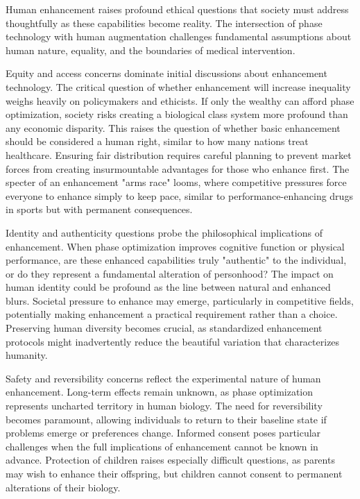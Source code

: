 \documentclass[12pt,a4paper]{report}
\begin{document}
Human enhancement raises profound ethical questions that society must address thoughtfully as these capabilities become reality. The intersection of phase technology with human augmentation challenges fundamental assumptions about human nature, equality, and the boundaries of medical intervention.

Equity and access concerns dominate initial discussions about enhancement technology. The critical question of whether enhancement will increase inequality weighs heavily on policymakers and ethicists. If only the wealthy can afford phase optimization, society risks creating a biological class system more profound than any economic disparity. This raises the question of whether basic enhancement should be considered a human right, similar to how many nations treat healthcare. Ensuring fair distribution requires careful planning to prevent market forces from creating insurmountable advantages for those who enhance first. The specter of an enhancement "arms race" looms, where competitive pressures force everyone to enhance simply to keep pace, similar to performance-enhancing drugs in sports but with permanent consequences.

Identity and authenticity questions probe the philosophical implications of enhancement. When phase optimization improves cognitive function or physical performance, are these enhanced capabilities truly "authentic" to the individual, or do they represent a fundamental alteration of personhood? The impact on human identity could be profound as the line between natural and enhanced blurs. Societal pressure to enhance may emerge, particularly in competitive fields, potentially making enhancement a practical requirement rather than a choice. Preserving human diversity becomes crucial, as standardized enhancement protocols might inadvertently reduce the beautiful variation that characterizes humanity.

Safety and reversibility concerns reflect the experimental nature of human enhancement. Long-term effects remain unknown, as phase optimization represents uncharted territory in human biology. The need for reversibility becomes paramount, allowing individuals to return to their baseline state if problems emerge or preferences change. Informed consent poses particular challenges when the full implications of enhancement cannot be known in advance. Protection of children raises especially difficult questions, as parents may wish to enhance their offspring, but children cannot consent to permanent alterations of their biology.
\end{document}
